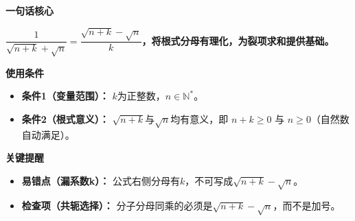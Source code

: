 \begin{summarybox}
	\textbf{\textcolor{CSummary}{一句话核心}}

	\textbf{$\dfrac{1}{\sqrt{n+k}+\sqrt{n}}=\dfrac{\sqrt{n+k}-\sqrt{n}}{k}$，将根式分母有理化，为裂项求和提供基础。}

	\medskip
	\textbf{\textcolor{CSummary}{使用条件}}
	\begin{itemize}[leftmargin=*, itemsep=0.5em, topsep=0.4em]
		\item \textbf{条件1（变量范围）：} $k$为正整数，$n\in\mathbb{N}^{*}$。
		\item \textbf{条件2（根式意义）：} $\sqrt{n+k}$与$\sqrt{n}$均有意义，即 $n+k\geq 0$ 与 $n\geq 0$（自然数自动满足）。
	\end{itemize}

	\medskip
	\textbf{\textcolor{CSummary}{关键提醒}}
	\begin{itemize}[leftmargin=*, itemsep=0.5em, topsep=0.4em]
		\item \textbf{易错点（漏系数k）：} 公式右侧分母有$k$，不可写成$\sqrt{n+k}-\sqrt{n}$。
		\item \textbf{检查项（共轭选择）：} 分子分母同乘的必须是$\sqrt{n+k}-\sqrt{n}$，而不是加号。
	\end{itemize}
\end{summarybox}
